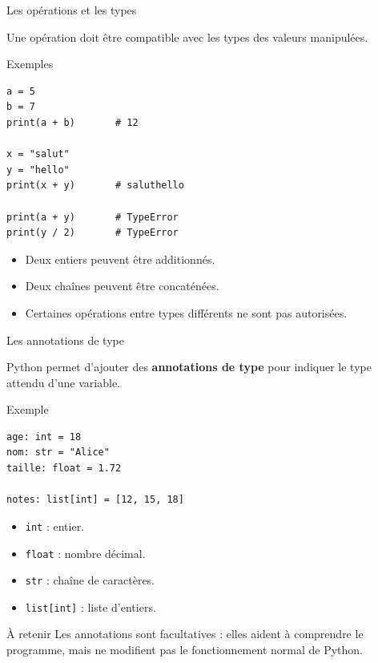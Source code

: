 \documentclass[10pt]{beamer}
\begin{document}
\begin{frame}[fragile]{Les opérations et les types}

Une opération doit être compatible avec les types
des valeurs manipulées.

\begin{exampleblock}{Exemples}
\small
\begin{lstlisting}
a = 5
b = 7
print(a + b)       # 12

x = "salut"
y = "hello"
print(x + y)       # saluthello

print(a + y)       # TypeError
print(y / 2)       # TypeError
\end{lstlisting}
\end{exampleblock}

\begin{itemize}
    \item Deux entiers peuvent être additionnés.
    \item Deux chaînes peuvent être concaténées.
    \item Certaines opérations entre types différents
    ne sont pas autorisées.
\end{itemize}

\end{frame}
\begin{frame}[fragile]{Les annotations de type}

Python permet d'ajouter des \textbf{annotations de type}
pour indiquer le type attendu d'une variable.

\begin{exampleblock}{Exemple}
\small
\begin{lstlisting}
age: int = 18
nom: str = "Alice"
taille: float = 1.72

notes: list[int] = [12, 15, 18]
\end{lstlisting}
\end{exampleblock}

\begin{itemize}
    \item \texttt{int} : entier.
    \item \texttt{float} : nombre décimal.
    \item \texttt{str} : chaîne de caractères.
    \item \texttt{list[int]} : liste d'entiers.
\end{itemize}

\begin{block}{À retenir}
\small
Les annotations sont facultatives : elles aident à comprendre
le programme, mais ne modifient pas le fonctionnement normal
de Python.
\end{block}

\end{frame}
\end{document}
